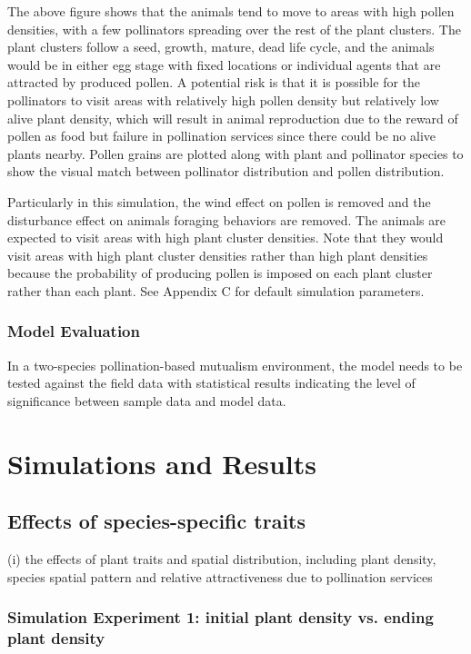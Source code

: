 \documentclass[3p,,preprint,12pt]{elsarticle}
\begin{document}
The above figure shows that the animals tend to move to areas with high pollen densities, with a few pollinators spreading over the rest of the plant clusters. The plant clusters follow a seed, growth, mature, dead life cycle, and the animals would be in either egg stage with fixed locations or individual agents that are attracted by produced pollen. A potential risk is that it is possible for the pollinators to visit areas with relatively high pollen density but relatively low alive plant density, which will result in animal reproduction due to the reward of pollen as food but failure in pollination services since there could be no alive plants nearby. Pollen grains are plotted along with plant and pollinator species to show the visual match between pollinator distribution and pollen distribution. 

Particularly in this simulation, the wind effect on pollen is removed and the disturbance effect on animals foraging behaviors are removed. The animals are expected to visit areas with high plant cluster densities. Note that they would visit areas with high plant cluster densities rather than high plant densities because the probability of producing pollen is imposed on each plant cluster rather than each plant. See Appendix C for default simulation parameters. 
    
\subsubsection{Model Evaluation} 
In a two-species pollination-based mutualism environment, the model needs to be tested against the field data with statistical results indicating the level of significance between sample data and model data.

\section{Simulations and Results}
\subsection{Effects of species-specific traits}
(i) the effects of plant traits and spatial distribution, including plant density, species spatial pattern and relative attractiveness due to pollination services

\subsubsection{Simulation Experiment 1: initial plant density vs. ending plant density}
\end{document}
